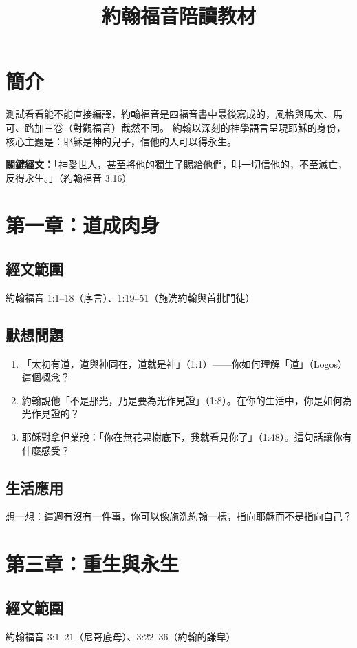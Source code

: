 \documentclass[12pt, a4paper]{article}
\title{約翰福音陪讀教材}
\author{}
\date{}
\begin{document}
\maketitle

\section*{簡介}
測試看看能不能直接編譯，約翰福音是四福音書中最後寫成的，風格與馬太、馬可、路加三卷（對觀福音）截然不同。
約翰以深刻的神學語言呈現耶穌的身份，核心主題是：耶穌是神的兒子，信他的人可以得永生。

\bigskip
\noindent\textbf{關鍵經文：}「神愛世人，甚至將他的獨生子賜給他們，叫一切信他的，不至滅亡，反得永生。」（約翰福音 3:16）

\section{第一章：道成肉身}

\subsection*{經文範圍}
約翰福音 1:1--18（序言）、1:19--51（施洗約翰與首批門徒）

\subsection*{默想問題}
\begin{enumerate}[leftmargin=*, label=\arabic*.]
  \item 「太初有道，道與神同在，道就是神」（1:1）——你如何理解「道」（Logos）這個概念？
  \item 約翰說他「不是那光，乃是要為光作見證」（1:8）。在你的生活中，你是如何為光作見證的？
  \item 耶穌對拿但業說：「你在無花果樹底下，我就看見你了」（1:48）。這句話讓你有什麼感受？
\end{enumerate}

\subsection*{生活應用}
想一想：這週有沒有一件事，你可以像施洗約翰一樣，指向耶穌而不是指向自己？

\section{第三章：重生與永生}

\subsection*{經文範圍}
約翰福音 3:1--21（尼哥底母）、3:22--36（約翰的謙卑）
\end{document}
